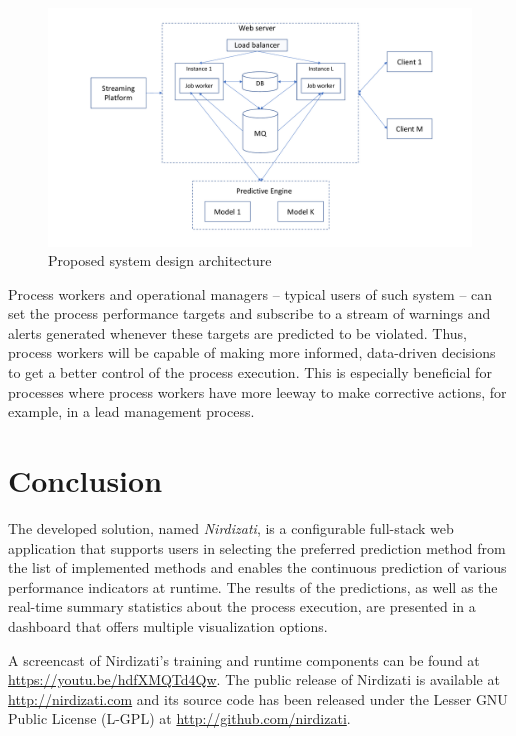 \documentclass[runningheads,a4paper]{llncs}
\begin{document}
\begin{figure}
	\centering
	\includegraphics[width=1\textwidth]{img/nirdizati-runtime}
	\caption{Proposed system design architecture}
	\label{fig:nirdizati-runtime}
\end{figure}

Process workers and operational managers – typical users of such system – can set the process performance targets and subscribe to a stream of warnings and alerts generated whenever these targets are predicted to be violated. Thus, process workers will be capable of making more informed, data-driven decisions to get a better control of the process execution. This is especially beneficial for processes where process workers have more leeway to make corrective actions, for example, in a lead management process.

\section{Conclusion} \label{sec:conclusion}
The developed solution, named \emph{Nirdizati}, is a configurable full-stack web application that supports users in selecting the preferred prediction method from the list of implemented methods and enables the continuous prediction of various performance indicators at runtime.
The results of the predictions, as well as the real-time summary statistics about the process execution, are presented in a dashboard that offers multiple visualization options.

A screencast of Nirdizati's training and runtime components can be found at \url{https://youtu.be/hdfXMQTd4Qw}. The public release of Nirdizati is available at \url{http://nirdizati.com} and its source code has been released under the Lesser GNU Public License (L-GPL) at \url{http://github.com/nirdizati}. 


\end{document}
